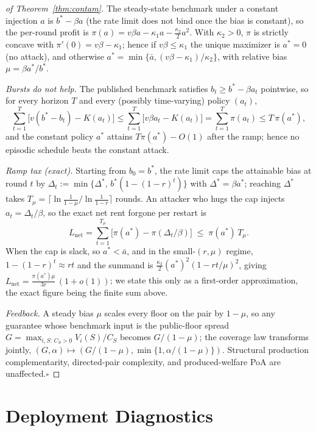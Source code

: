 \begin{proof}[of Theorem~\ref{thm:contam}]
The steady-state benchmark under a constant injection $a$ is
$b^\ast-\beta a$ (the rate limit does not bind once the bias is
constant), so the per-round profit is
$\pi(a)=v\beta a-\kappa_1 a-\tfrac{\kappa_2}{2}a^2$. With $\kappa_2>0$,
$\pi$ is strictly concave with $\pi'(0)=v\beta-\kappa_1$; hence if
$v\beta\le\kappa_1$ the unique maximizer is $a^\ast=0$ (no attack), and
otherwise $a^\ast=\min\{\bar a,(v\beta-\kappa_1)/\kappa_2\}$, with
relative bias $\mu=\beta a^\ast/b^\ast$.

\emph{Bursts do not help.} The published benchmark satisfies
$b_t\ge b^\ast-\beta a_t$ pointwise, so for every horizon $T$ and every
(possibly time-varying) policy $(a_t)$,
\[
\sum_{t=1}^T\big[v(b^\ast-b_t)-K(a_t)\big]
\le \sum_{t=1}^T\big[v\beta a_t-K(a_t)\big]
=\sum_{t=1}^T\pi(a_t)\le T\,\pi(a^\ast),
\]
and the constant policy $a^\ast$ attains $T\pi(a^\ast)-O(1)$ after the
ramp; hence no episodic schedule beats the constant attack.

\emph{Ramp tax (exact).} Starting from $b_0=b^\ast$, the rate limit caps
the attainable bias at round $t$ by $\Delta_t:=\min\{\Delta^\ast,\,
b^\ast(1-(1-r)^t)\}$ with $\Delta^\ast=\beta a^\ast$; reaching
$\Delta^\ast$ takes $T_\mu=\big\lceil\ln\tfrac{1}{1-\mu}\big/
\ln\tfrac{1}{1-r}\big\rceil$ rounds. An attacker who hugs the cap injects
$a_t=\Delta_t/\beta$, so the exact net rent forgone per restart is
\[
L_{\mathrm{net}}=\sum_{t=1}^{T_\mu}\Big[\pi(a^\ast)-\pi(\Delta_t/\beta)\Big]
\;\le\; \pi(a^\ast)\,T_\mu .
\]
When the cap is slack, so $a^\ast<\bar a$, and in the small-$(r,\mu)$
regime, $1-(1-r)^t\approx rt$ and the summand is
$\tfrac{\kappa_2}{2}(a^\ast)^2(1-rt/\mu)^2$, giving
$L_{\mathrm{net}}=\tfrac{\pi(a^\ast)\mu}{3r}\,(1+o(1))$; we state this only
as a first-order approximation, the exact figure being the finite sum
above.

\emph{Feedback.} A steady bias $\mu$ scales every floor on the pair by
$1-\mu$, so any guarantee whose benchmark input is the public-floor spread
$G=\max_{i,S:\,C_S>0}V_i(S)/C_S$ becomes $G/(1-\mu)$; the coverage law transforms
jointly,
$(G,\alpha)\mapsto(G/(1-\mu),\min\{1,\alpha/(1-\mu)\})$. Structural
production complementarity, directed-pair complexity, and produced-welfare
PoA are unaffected.\hfill$\square$
\end{proof}

\section{Deployment Diagnostics}\label{app:empirical}

